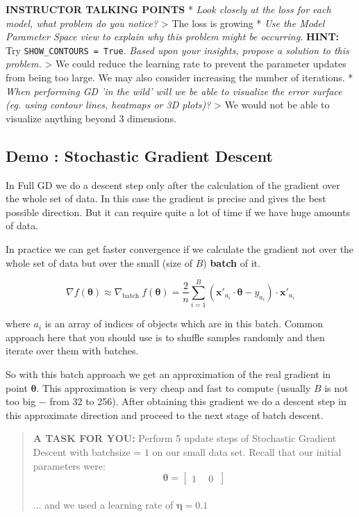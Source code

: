 \documentclass[11pt]{article}
\begin{document}
\textbf{INSTRUCTOR TALKING POINTS} * \emph{Look closely at the loss for
each model, what problem do you notice?} \textgreater{} The loss is
growing * \emph{Use the Model Parameter Space view to explain why this
problem might be occurring.} \textbf{HINT:} Try
\texttt{SHOW\_CONTOURS\ =\ True}. \emph{Based upon your insights,
propose a solution to this problem.} \textgreater{} We could reduce the
learning rate to prevent the parameter updates from being too large. We
may also consider increasing the number of iterations. * \emph{When
performing GD 'in the wild' will we be able to visualize the error
surface (eg. using contour lines, heatmaps or 3D plots)?} \textgreater{}
We would not be able to visualize anything beyond 3 dimensions.

    \subsection{Demo : Stochastic Gradient
Descent}\label{demo-stochastic-gradient-descent}

In Full GD we do a descent step only after the calculation of the
gradient over the whole set of data. In this case the gradient is
precise and gives the best possible direction. But it can require quite
a lot of time if we have huge amounts of data.

In practice we can get faster convergence if we calculate the gradient
not over the whole set of data but over the small (size of \(B\))
\textbf{batch} of it.

\begin{equation}\tag{3.2}
\nabla f(\boldsymbol{\theta}) \approx \nabla_{\text{batch}\,\,} f(\boldsymbol{\theta}) = \frac{2}{n}\sum_{i=1}^{B}\left(\mathbf{x}'_{a_i}\cdot \boldsymbol{\theta} - y_{a_i}\right)\cdot \mathbf{x}'_{a_i}
\end{equation}

where \(a_i\) is an array of indices of objects which are in this batch.
Common approach here that you should use is to shuffle samples randomly
and then iterate over them with batches.

So with this batch approach we get an approximation of the real gradient
in point \(\boldsymbol{\theta}\). This approximation is very cheap and
fast to compute (usually \(B\) is not too big \(-\) from 32 to 256).
After obtaining this gradient we do a descent step in this approximate
direction and proceed to the next stage of batch descent.

\begin{quote}
\textbf{A TASK FOR YOU:} Perform 5 update steps of Stochastic Gradient
Descent with batchsize = \(1\) on our small data set. Recall that our
initial parameters were:
\[ \boldsymbol{\theta} = \begin{bmatrix} 1 \ \quad 0 \ \end{bmatrix}\]\\
... and we used a learning rate of \(\boldsymbol{\eta} = 0.1\)
\end{quote}
\end{document}
